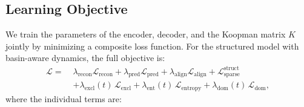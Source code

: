 \subsection{Learning Objective}
\label{sec:learning-objective}

We train the parameters of the encoder, decoder, and the Koopman matrix $K$ jointly by minimizing a composite loss function. For the structured model with basin-aware dynamics, the full objective is:
\begin{equation}
\label{eq:structured-loss}
\begin{split}
    \mathcal{L} = \;& \lambda_{\text{recon}} \mathcal{L}_{\text{recon}} + \lambda_{\text{pred}} \mathcal{L}_{\text{pred}} + \lambda_{\text{align}} \mathcal{L}_{\text{align}} + \mathcal{L}_{\text{sparse}}^{\text{struct}} \\
    &+ \lambda_{\text{excl}}(t) \, \mathcal{L}_{\text{excl}} + \lambda_{\text{ent}}(t) \, \mathcal{L}_{\text{entropy}} + \lambda_{\text{dom}}(t) \, \mathcal{L}_{\text{dom}},
\end{split}
\end{equation}
where the individual terms are:
